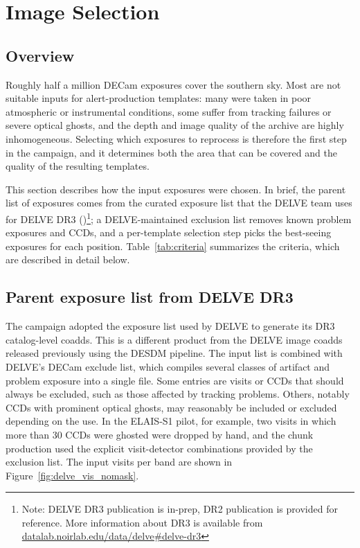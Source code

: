 \section{Image Selection}

\label{sec:selection}

\subsection{Overview}

Roughly half a million DECam exposures cover the southern sky. Most are not suitable inputs for alert-production templates: many were taken in poor atmospheric or instrumental conditions, some suffer from tracking failures or severe optical ghosts, and the depth and image quality of the archive are highly inhomogeneous. Selecting which exposures to reprocess is therefore the first step in the campaign, and it determines both the area that can be covered and the quality of the resulting templates.

This section describes how the input exposures were chosen. In brief, the parent list of exposures comes from the curated exposure list that the DELVE team uses for DELVE DR3 (\cite{DELVE})\footnote{Note: DELVE DR3 publication is in-prep, DR2 publication is provided for reference. More information about DR3 is available from \href{https://datalab.noirlab.edu/data/delve\#delve-dr3}{datalab.noirlab.edu/data/delve\#delve-dr3}}; a DELVE-maintained exclusion list removes known problem exposures and CCDs, and a per-template selection step picks the best-seeing exposures for each position. Table~\ref{tab:criteria} summarizes the criteria, which are described in detail below.

\subsection{Parent exposure list from DELVE DR3}

The campaign adopted the exposure list used by DELVE to generate its DR3 catalog-level coadds. This is a different product from the DELVE image coadds released previously using the DESDM pipeline.
The input list is combined with DELVE's DECam exclude list, which compiles several classes of artifact and problem exposure into a single file. Some entries are visits or CCDs that should always be excluded, such as those affected by tracking problems. Others, notably CCDs with prominent optical ghosts, may reasonably be included or excluded depending on the use. In the ELAIS-S1 pilot, for example, two visits in which more than 30 CCDs were ghosted were dropped by hand, and the chunk production used the explicit visit-detector combinations provided by the exclusion list. The input visits per band are shown in Figure~\ref{fig:delve_vis_nomask}.

